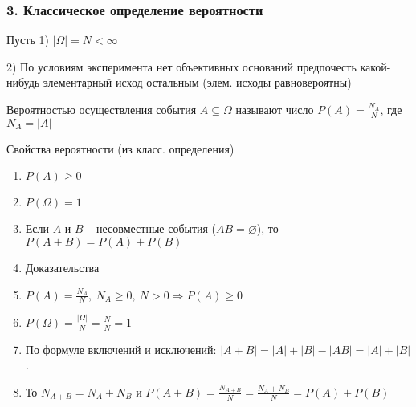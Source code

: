 \subsubsection*{3. Классическое определение вероятности}
Пусть 1) $|\Omega|=N < \infty$

2) По условиям эксперимента нет объективных оснований предпочесть какой-нибудь элементарный исход остальным (элем. исходы равновероятны)

\OPR Вероятностью осуществления события $A\subseteq\Omega$ называют число $P(A)=\tfrac{N_A}{N}$, где $N_A=|A|$\newline

Свойства вероятности (из класс. определения)
\begin{enumerate}[topsep=0pt, leftmargin=20pt, noitemsep, label=\arabic*\degree]
	\item $P(A) \geq 0$
	
	\item $P(\Omega) = 1$
	
	\item Если $A$ и $B$ -- несовместные события ($AB=\varnothing$), то $P(A+B)=P(A)+P(B)$
	
	\item [] Доказательства
	
	\setcounter{enumi}{0}
	
	\item $P(A) = \frac{N_A}{N}, ~N_A\geq 0,~N>0\Rightarrow P(A) \geq 0$
	
	\item $P(\Omega)=\frac{|\Omega|}{N}=\frac{N}{N}=1$
	
	\item По формуле включений и исключений: $|A+B|=|A|+|B|-|AB|=|A|+|B|$. 
	\item [] То $N_{A+B} = N_A + N_B$ и $P(A+B)=\frac{N_{A+B}}{N}=\frac{N_A+N_B}{N}=P(A)+P(B)$
\end{enumerate}

\clearpage


